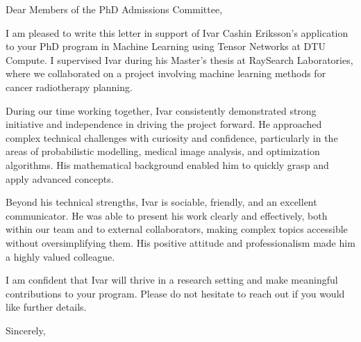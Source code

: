 \documentclass[11pt,a4paper]{letter}
\date{\today}
\begin{document}
\begin{letter}{}

\opening{Dear Members of the PhD Admissions Committee,}

I am pleased to write this letter in support of Ivar Cashin Eriksson's application to your PhD program in Machine Learning using Tensor Networks at DTU Compute. I supervised Ivar during his Master's thesis at RaySearch Laboratories, where we collaborated on a project involving machine learning methods for cancer radiotherapy planning.

During our time working together, Ivar consistently demonstrated strong initiative and independence in driving the project forward. He approached complex technical challenges with curiosity and confidence, particularly in the areas of probabilistic modelling, medical image analysis, and optimization algorithms. His mathematical background enabled him to quickly grasp and apply advanced concepts.

Beyond his technical strengths, Ivar is sociable, friendly, and an excellent communicator. He was able to present his work clearly and effectively, both within our team and to external collaborators, making complex topics accessible without oversimplifying them. His positive attitude and professionalism made him a highly valued colleague.

I am confident that Ivar will thrive in a research setting and make meaningful contributions to your program. Please do not hesitate to reach out if you would like further details.

\closing{Sincerely,}

\end{letter}
\end{document}
